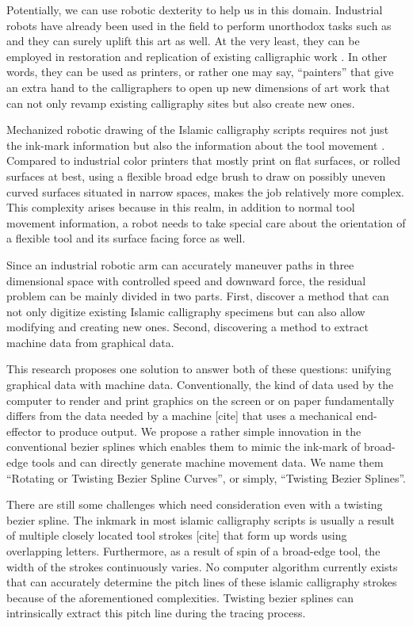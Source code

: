 {    Potentially, we can use robotic dexterity to help us in this domain. Industrial robots have already been used in the field to perform unorthodox tasks such as \cite{bib09, bib10,bib11,bib12} and they can surely uplift this art as well. At the very least, they can be employed in restoration and replication of existing calligraphic work \cite{bib13}. In other words, they can be used as printers, or rather one may say, ``painters'' that give an extra hand to the calligraphers to open up new dimensions of art work that can not only revamp existing calligraphy sites but also create new ones.

    Mechanized robotic drawing of the Islamic calligraphy scripts requires not just the ink-mark information but also the information about the tool movement \cite{bib03}. Compared to industrial color printers that mostly print on flat surfaces, or rolled surfaces at best, using a flexible broad edge brush to draw on possibly uneven curved surfaces situated in narrow spaces, makes the job relatively more complex. This complexity arises because in this realm, in addition to normal tool movement information, a robot needs to take special care about the orientation of a flexible tool and its surface facing force as well.

    Since an industrial robotic arm can accurately maneuver paths in three dimensional space with controlled speed and downward force, the residual problem can be mainly divided in two parts. First, discover a method that can not only digitize existing Islamic calligraphy specimens but can also allow modifying and creating new ones. Second, discovering a method to extract machine data from graphical data.

    This research proposes one solution to answer both of these questions: unifying graphical data with machine data. Conventionally, the kind of data used by the computer to render and print graphics on the screen or on paper fundamentally differs from the data needed by a machine [cite] that uses a mechanical end-effector to produce output. We propose a rather simple innovation in the conventional bezier splines which enables them to mimic the ink-mark of broad-edge tools and can directly generate machine movement data. We name them ``Rotating or Twisting Bezier Spline Curves'', or simply, ``Twisting Bezier Splines''.

    There are still some challenges which need consideration even with a twisting bezier spline. The inkmark in most islamic calligraphy scripts is usually a result of multiple closely located tool strokes [cite] that form up words using overlapping letters. Furthermore, as a result of spin of a broad-edge tool, the width of the strokes continuously varies. No computer algorithm currently exists that can accurately determine the pitch lines of these islamic calligraphy strokes because of the aforementioned complexities. Twisting bezier splines can intrinsically extract this pitch line during the tracing process.

}
